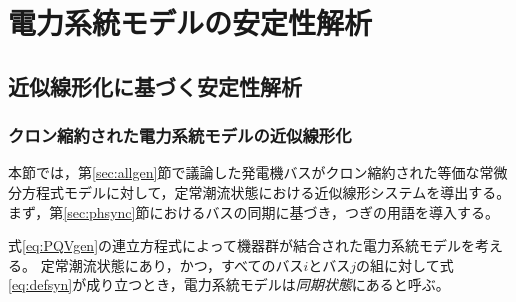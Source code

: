 \documentclass[tombow,dvipdfmx]{corona-a5}
\begin{document}
\chapter{電力系統モデルの安定性解析}\label{sec:staana}

\section{近似線形化に基づく安定性解析}\label{sec:stalin}

\subsection{クロン縮約された電力系統モデルの近似線形化}

本節では，第\ref{sec:allgen}節で議論した発電機バスがクロン縮約された等価な常微分方程式モデルに対して，定常潮流状態における近似線形システムを導出する。
まず，第\ref{sec:phsync}節におけるバスの同期に基づき，つぎの用語を導入する。

\begin{定義}[電力系統モデルの同期状態]
\label{def:syncall}
式\ref{eq:PQVgen}の連立方程式によって機器群が結合された電力系統モデルを考える。
定常潮流状態にあり，かつ，すべてのバス$i$とバス$j$の組に対して式\ref{eq:defsyn}が成り立つとき，電力系統モデルは\emph{同期状態}にあると呼ぶ。
\end{定義}
\end{document}
